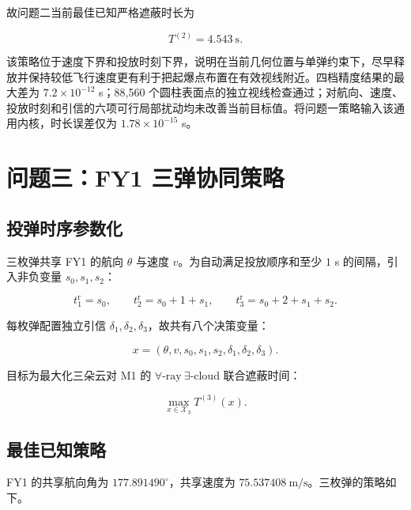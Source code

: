 故问题二当前最佳已知严格遮蔽时长为

\[
\boxed{T^{(2)}=4.543\ \mathrm s}.
\]

该策略位于速度下界和投放时刻下界，说明在当前几何位置与单弹约束下，尽早释放并保持较低飞行速度更有利于把起爆点布置在有效视线附近。四档精度结果的最大差为 $7.2\times10^{-12}$ s；88,560 个圆柱表面点的独立视线检查通过；对航向、速度、投放时刻和引信的六项可行局部扰动均未改善当前目标值。将问题一策略输入该通用内核，时长误差仅为 $1.78\times10^{-15}$ s。

\section{问题三：FY1 三弹协同策略}

\subsection{投弹时序参数化}

三枚弹共享 FY1 的航向 $\theta$ 与速度 $v$。为自动满足投放顺序和至少 $1$ s 的间隔，引入非负变量 $s_0,s_1,s_2$：

\[
t_1^{\mathrm r}=s_0,\qquad
t_2^{\mathrm r}=s_0+1+s_1,\qquad
t_3^{\mathrm r}=s_0+2+s_1+s_2.
\]

每枚弹配置独立引信 $\delta_1,\allowbreak{}\delta_2,\allowbreak{}\delta_3$，故共有八个决策变量：

\[
x=(\theta,v,s_0,s_1,s_2,\delta_1,\delta_2,\delta_3).
\]

目标为最大化三朵云对 M1 的 $\forall\text{-ray}\ \exists\text{-cloud}$ 联合遮蔽时间：

\[
\max_{x\in\mathcal X_3}T^{(3)}(x).
\]

\subsection{最佳已知策略}

FY1 的共享航向角为 $177.891490^\circ$，共享速度为 $75.537408\ \mathrm{m/s}$。三枚弹的策略如下。

\begin{center}
\scriptsize
\setlength{\tabcolsep}{3pt}
\renewcommand{\arraystretch}{1.18}
\end{center}

